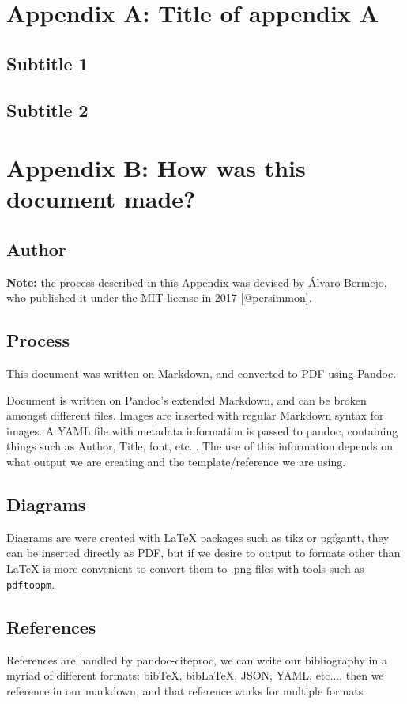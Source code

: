 \chapter{Appendix A: Title of appendix
A}\label{appendix-a-title-of-appendix-a}

\section{Subtitle 1}\label{subtitle-1}

\section{Subtitle 2}\label{subtitle-2}

\chapter{Appendix B: How was this document
made?}\label{appendix-b-how-was-this-document-made}

\section{Author}\label{author}

\textbf{Note:} the process described in this Appendix was devised by
Álvaro Bermejo, who published it under the MIT license in 2017
{[}@persimmon{]}.

\section{Process}\label{process}

This document was written on Markdown, and converted to PDF using
Pandoc.

Document is written on Pandoc's extended Markdown, and can be broken
amongst different files. Images are inserted with regular Markdown
syntax for images. A YAML file with metadata information is passed to
pandoc, containing things such as Author, Title, font, etc... The use of
this information depends on what output we are creating and the
template/reference we are using.

\section{Diagrams}\label{diagrams}

Diagrams are were created with LaTeX packages such as tikz or pgfgantt,
they can be inserted directly as PDF, but if we desire to output to
formats other than LaTeX is more convenient to convert them to .png
files with tools such as \texttt{pdftoppm}.

\section{References}\label{references}

References are handled by pandoc-citeproc, we can write our bibliography
in a myriad of different formats: bibTeX, bibLaTeX, JSON, YAML, etc...,
then we reference in our markdown, and that reference works for multiple
formats
